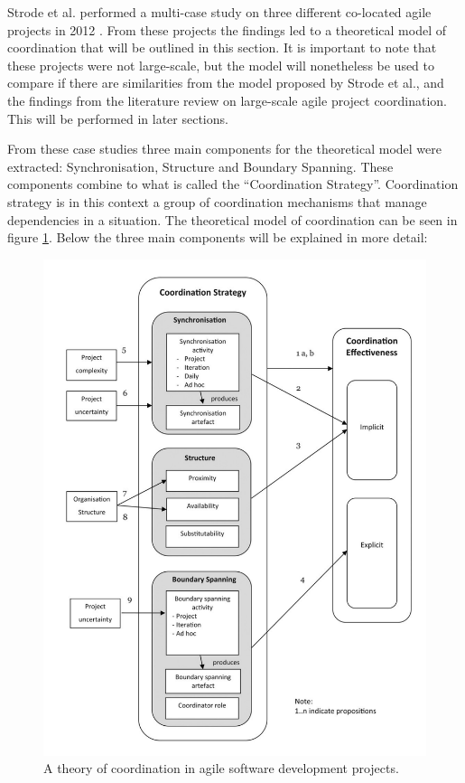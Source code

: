 
Strode et al. performed a multi-case study on three different co-located agile projects in 2012 \cite{Strode2012}. From these projects the findings led to a theoretical model of coordination that will be outlined in this section. It is important to note that these projects were not large-scale, but the model will nonetheless be used to compare if there are similarities from the model proposed by Strode et al., and the findings from the literature review on large-scale agile project coordination. This will be performed in later sections.

From these case studies three main components for the theoretical model were extracted: Synchronisation, Structure and Boundary Spanning. These components combine to what is called the ``Coordination Strategy''. Coordination strategy is in this context a group of coordination mechanisms that manage dependencies in a situation. The theoretical model of coordination can be seen in figure \ref{strode}. Below the three main components will be explained in more detail:

\begin{figure}
\centering
\includegraphics[width=160mm]{images/Strode.pdf}
\caption{A theory of coordination in agile software development projects.}
\label{strode}
\end{figure}

